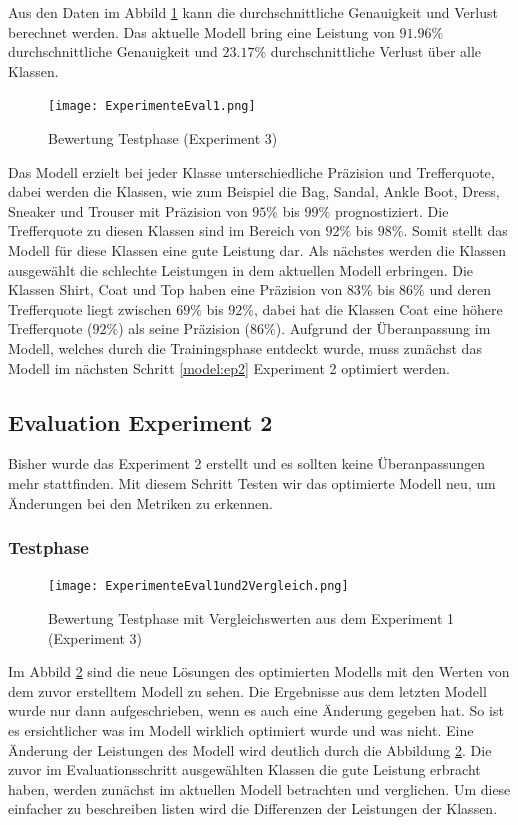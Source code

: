 \documentclass[12pt]{scrreprt}
\begin{document}
Aus den Daten im Abbild \ref{fig:fig18} kann die durchschnittliche Genauigkeit und Verlust berechnet werden. Das aktuelle Modell bring eine Leistung von $91.96\%$ durchschnittliche Genauigkeit und $23.17\%$ durchschnittliche Verlust über alle Klassen. \\

\begin{figure}[h!]
	\centering
	\texttt{[image: ExperimenteEval1.png]}
	\caption{ Bewertung Testphase \cite{HK22}(Experiment 3)}
	\label{fig:fig18}
\end{figure}

Das Modell erzielt bei jeder Klasse unterschiedliche Präzision und Trefferquote, dabei werden die Klassen, wie zum Beispiel die Bag, Sandal, Ankle Boot, Dress, Sneaker und Trouser mit Präzision von $95\%$ bis $99\%$ prognostiziert. Die Trefferquote zu diesen Klassen sind im Bereich von $92\%$ bis $98\%$. Somit stellt das Modell für diese Klassen eine gute Leistung dar. Als nächstes werden die Klassen ausgewählt die schlechte Leistungen in dem aktuellen Modell erbringen. Die Klassen Shirt, Coat und Top haben eine Präzision von $83\%$ bis $86\%$ und deren Trefferquote liegt zwischen $69\%$ bis $92\%$, dabei hat die Klassen Coat eine höhere Trefferquote ($92\%$)  als seine Präzision ($86\%$). Aufgrund der Überanpassung im Modell, welches durch die Trainingsphase entdeckt wurde, muss zunächst das Modell im nächsten Schritt \ref{model:ep2} Experiment 2 optimiert werden.

\subsection{Evaluation Experiment 2}\label{eval:eval2}

Bisher wurde das Experiment 2 erstellt und es sollten keine Überanpassungen mehr stattfinden. Mit diesem Schritt Testen wir das optimierte Modell neu, um Änderungen bei den Metriken zu erkennen.
\newpage
\subsubsection{Testphase}

\begin{figure}[h!]
	\centering
	\texttt{[image: ExperimenteEval1und2Vergleich.png]}
	\caption{ Bewertung Testphase mit Vergleichswerten aus dem Experiment 1 \cite{HK22}(Experiment 3)}
	\label{fig:fig30}
\end{figure}

Im Abbild \ref{fig:fig30} sind die neue Lösungen des optimierten Modells mit den Werten von dem zuvor erstelltem Modell zu sehen. Die Ergebnisse aus dem letzten Modell wurde nur dann aufgeschrieben, wenn es auch eine Änderung gegeben hat. So ist es ersichtlicher was im Modell wirklich optimiert wurde und was nicht. Eine Änderung der Leistungen des Modell wird deutlich durch die Abbildung \ref{fig:fig30}. Die zuvor im Evaluationsschritt ausgewählten Klassen die gute Leistung erbracht haben, werden zunächst im aktuellen Modell betrachten und verglichen. Um diese einfacher zu beschreiben listen wird die Differenzen der Leistungen der Klassen.
\end{document}
